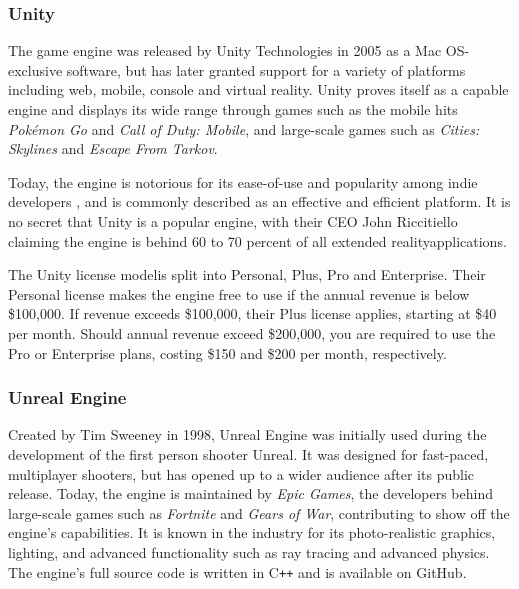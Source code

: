 \subsubsection{Unity}
The game engine was released by Unity Technologies in 2005 as a Mac OS-exclusive software, but has later granted support for a variety of platforms including web, mobile, console and virtual reality. Unity proves itself as a capable engine and displays its wide range through games such as the mobile hits \textit{Pokémon Go} and \textit{Call of Duty: Mobile}, and large-scale games such as \textit{Cities: Skylines} and \textit{Escape From Tarkov}.

Today, the engine is notorious for its ease-of-use and popularity among indie developers \cite{unity_dealessandri_2020}, and is commonly described as an effective and efficient platform.  \cite{stepico_games_2021} It is no secret that Unity is a popular engine, with their CEO John Riccitiello claiming the engine is behind 60 to 70 percent of all extended reality\footnotemark[1] applications. \cite{chaudry_2020}


The Unity license model\footnotemark[2] is split into Personal, Plus, Pro and Enterprise. Their Personal license makes the engine free to use if the annual revenue is below \$100,000. If revenue exceeds \$100,000, their Plus license applies, starting at \$40 per month. Should annual revenue exceed \$200,000, you are required to use the Pro or Enterprise plans, costing \$150 and \$200 per month, respectively. 



\subsubsection{Unreal Engine}
Created by Tim Sweeney in 1998, Unreal Engine was initially used during the development of the first person shooter Unreal. It was designed for fast-paced, multiplayer shooters, but has opened up to a wider audience after its public release. Today, the engine is maintained by \textit{Epic Games}, the developers behind large-scale games such as \textit{Fortnite} and \textit{Gears of War}, contributing to show off the engine's capabilities. It is known in the industry for its photo-realistic graphics, lighting, and advanced functionality such as ray tracing and advanced physics. The engine's full source code is written in C\texttt{++} and is available on GitHub\footnotemark[1].

